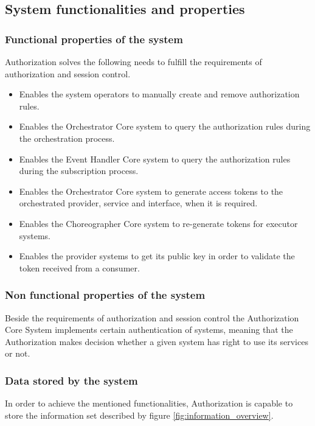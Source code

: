 \documentclass[a4paper]{arrowhead}
\begin{document}
\subsection{System functionalities and properties}
\label{sec:properties}

\subsubsection {Functional properties of the system}
Authorization solves the following needs to fulfill the requirements of authorization and session control.

\begin{itemize}
    \item Enables the system operators to manually create and remove authorization rules.
    \item Enables the Orchestrator Core system to query the authorization rules during the orchestration process.
    \item Enables the Event Handler Core system to query the authorization rules during the subscription process.
    \item Enables the Orchestrator Core system to generate access tokens to the orchestrated provider, service and interface, when it is required.
    \item Enables the Choreographer Core system to re-generate tokens for executor systems.
    \item Enables the provider systems to get its public key in order to validate the token received from a consumer.
\end{itemize}

\subsubsection {Non functional properties of the system}
Beside the requirements of authorization and session control the Authorization Core System implements certain authentication of systems, meaning that the Authorization makes decision whether a given system has right to use its services or not.

\clearpage

\subsubsection {Data stored by the system}
In order to achieve the mentioned functionalities, Authorization is capable to store the information set described by figure \ref{fig:information_overview}.
\end{document}
